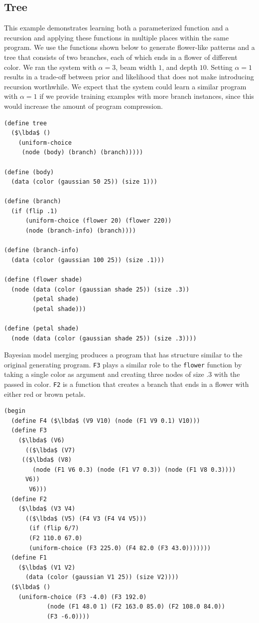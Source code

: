 \documentclass[a4paper,10pt]{article}
\newcommand{\lbda}{\color[rgb]{0,.3,.7} \lambda}
\begin{document}
\subsection{Tree}
This example demonstrates learning both a parameterized function and a recursion and applying these functions in multiple places within the same program. We use the functions shown below to generate flower-like patterns and a tree that consists of two branches, each of which ends in a flower of different color. We ran the system with $\alpha=3$, beam width $1$, and depth $10$.  Setting $\alpha=1$ results in a trade-off between prior and likelihood that does not make introducing recursion worthwhile. We expect that the system could learn a similar program with $\alpha=1$ if we provide training examples with more branch instances, since this would increase the amount of program compression.
\begin{lstlisting}[mathescape=true]
(define tree
  ($\lbda$ ()
    (uniform-choice
     (node (body) (branch) (branch)))))

(define (body) 
  (data (color (gaussian 50 25)) (size 1)))

(define (branch)
  (if (flip .1)
      (uniform-choice (flower 20) (flower 220))
      (node (branch-info) (branch))))

(define (branch-info)
  (data (color (gaussian 100 25)) (size .1)))

(define (flower shade)
  (node (data (color (gaussian shade 25)) (size .3))
        (petal shade)
        (petal shade)))

(define (petal shade)
  (node (data (color (gaussian shade 25)) (size .3))))
\end{lstlisting}
Bayesian model merging produces a program that has structure similar to the original generating program.  \texttt{F3} plays a similar role to the \texttt{flower} function by taking a single color as argument and creating three nodes of size $.3$ with the passed in color.  \texttt{F2} is a function that creates a branch that ends in a flower with either red or brown petals.
\begin{lstlisting}[mathescape=true]
(begin
  (define F4 ($\lbda$ (V9 V10) (node (F1 V9 0.1) V10)))
  (define F3
    ($\lbda$ (V6)
      (($\lbda$ (V7)
	 (($\lbda$ (V8)
	    (node (F1 V6 0.3) (node (F1 V7 0.3)) (node (F1 V8 0.3))))
	  V6))
       V6)))
  (define F2
    ($\lbda$ (V3 V4)
      (($\lbda$ (V5) (F4 V3 (F4 V4 V5)))
       (if (flip 6/7)
	   (F2 110.0 67.0)
	   (uniform-choice (F3 225.0) (F4 82.0 (F3 43.0)))))))
  (define F1
    ($\lbda$ (V1 V2)
      (data (color (gaussian V1 25)) (size V2))))
  ($\lbda$ ()
    (uniform-choice (F3 -4.0) (F3 192.0)
		    (node (F1 48.0 1) (F2 163.0 85.0) (F2 108.0 84.0))
		    (F3 -6.0))))
\end{lstlisting}
\end{document}
